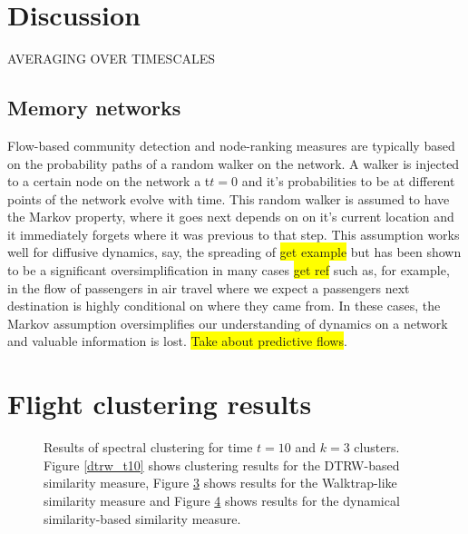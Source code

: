 \documentclass[12pt,a4paper]{article}
\begin{document}
\section{Discussion}
AVERAGING OVER TIMESCALES
\subsection{Memory networks}
Flow-based community detection and node-ranking measures are typically based on the probability paths of a random walker on the network. A walker is injected to a certain node on the network a t$t=0$ and it's probabilities to be at different points of the network evolve with time. This random walker is assumed to have the Markov property, where it goes next depends on on it's current location and it immediately forgets where it was previous to that step. This assumption works well for diffusive dynamics, say, the spreading of \colorbox{yellow}{get example} but has been shown to be a significant oversimplification in many cases \colorbox{yellow}{get ref} such as, for example, in the flow of passengers in air travel where we expect a passengers next destination is highly conditional on where they came from. In these cases, the Markov assumption oversimplifies our understanding of dynamics on a network and valuable information is lost. \colorbox{yellow}{Take about predictive flows}.

\printbibliography
\appendix
\section{Flight clustering results}

\begin{figure}[H]
  \centering
  \begin{subfigure}[b]{0.3\linewidth}
    \centering
  \caption{}\label{fig:dtrw_t10}
  \end{subfigure}
  \hfill
  \begin{subfigure}[b]{0.3\linewidth}
    \centering
  \caption{}\label{fig:wt_t10}
  \end{subfigure}
  \hfill
\end{figure}
\begin{figure}
  \ContinuedFloat
  \begin{subfigure}[b]{0.3\linewidth}
    \centering
  \caption{}\label{fig:dynsim_t10}
  \end{subfigure}
  \caption{Results of spectral clustering for time $t=10$ and $k=3$ clusters. Figure \ref{dtrw_t10} shows clustering results for the DTRW-based similarity measure, Figure \ref{fig:wt_t10} shows results for the Walktrap-like similarity measure and Figure \ref{fig:dynsim_t10} shows results for the dynamical similarity-based similarity measure.} \label{fig:flights t10}
\end{figure}
\end{document}
